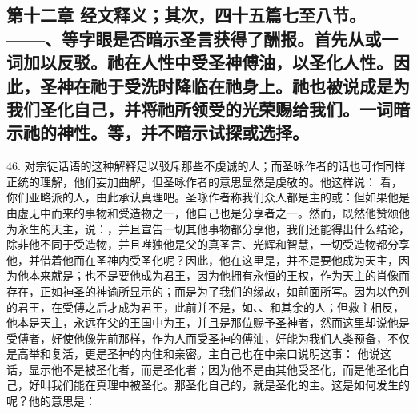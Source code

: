 
\subsection{第十二章 经文释义；其次，四十五篇七至八节。——、等字眼是否暗示圣言获得了酬报。首先从或一词加以反驳。祂在人性中受圣神傅油，以圣化人性。因此，圣神在祂于受洗时降临在祂身上。祂也被说成是为我们圣化自己，并将祂所领受的光荣赐给我们。一词暗示祂的神性。等，并不暗示试探或选择。}

46. 对宗徒话语的这种解释足以驳斥那些不虔诚的人；而圣咏作者的话也可作同样正统的理解，他们妄加曲解，但圣咏作者的意思显然是虔敬的。他这样说： 看，你们亚略派的人，由此承认真理吧。圣咏作者称我们众人都是主的或：但如果他是由虚无中而来的事物和受造物之一，他自己也是分享者之一。然而，既然他赞颂他为永生的天主，说：，并且宣告一切其他事物都分享他，我们还能得出什么结论，除非他不同于受造物，并且唯独他是父的真圣言、光辉和智慧，一切受造物都分享他，并借着他而在圣神内受圣化呢？因此，他在这里是，并不是要他成为天主，因为他本来就是；也不是要他成为君王，因为他拥有永恒的王权，作为天主的肖像而存在，正如神圣的神谕所显示的；而是为了我们的缘故，如前面所写。因为以色列的君王，在受傅之后才成为君王，此前并不是，如、、和其余的人；但救主相反，他本是天主，永远在父的王国中为王，并且是那位赐予圣神者，然而这里却说他是受傅者，好使他像先前那样，作为人而受圣神的傅油，好能为我们人类预备，不仅是高举和复活，更是圣神的内住和亲密。主自己也在中亲口说明这事： 他说这话，显示他不是被圣化者，而是圣化者；因为他不是由其他受圣化，而是他圣化自己，好叫我们能在真理中被圣化。那圣化自己的，就是圣化的主。这是如何发生的呢？他的意思是：\par

